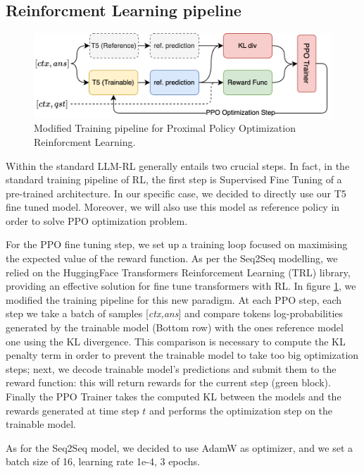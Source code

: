 \documentclass{article}
\begin{document}
\subsection{Reinforcment Learning pipeline}

\begin{figure}[h!]
    \centering
    \includegraphics[width=\linewidth]{assets/rl-loop.drawio.png}
    \caption{Modified Training pipeline for Proximal Policy Optimization Reinforcment Learning.}
    \label{fig:ppo-pipeline}
\end{figure}
Within the standard LLM-RL generally entails two crucial steps. In fact, in the standard training pipeline of RL, the first step is Supervised Fine Tuning of a pre-trained architecture. In our specific case, we decided to directly use our T5 fine tuned model. Moreover, we will also use this model as reference policy in order to solve PPO optimization problem.

For the PPO fine tuning step, we set up a training loop focused on maximising the expected value of the reward function. As per the Seq2Seq modelling, we relied on the HuggingFace Transformers Reinforcement Learning (TRL) library, providing an effective solution for fine tune transformers with RL. In figure \ref{fig:ppo-pipeline}, we modified the training pipeline for this new paradigm. At each PPO step, each step we take a batch of samples [\textit{ctx,ans}] and compare tokens log-probabilities generated by the trainable model (Bottom row) with the ones reference model one using the KL divergence. This comparison is necessary to compute the KL penalty term in order to prevent the trainable model to take too big optimization steps; next, we decode trainable model's predictions and submit them to the reward function: this will return rewards for the current step (green block). Finally the PPO Trainer takes the computed KL between the models and the rewards generated at time step $t$ and performs the optimization step on the trainable model.



As for the Seq2Seq model, we decided to use AdamW as optimizer, and we set a batch size of 16, learning rate 1e-4, 3 epochs.
\end{document}
